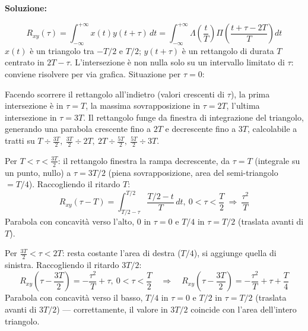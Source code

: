 \documentclass[12pt, a4paper]{article}
\begin{document}
\textbf{Soluzione:}

$$R_{xy}(\tau) = \int_{-\infty}^{+\infty}x(t)y(t+\tau)\,dt = \int_{-\infty}^{+\infty}\Lambda\!\left(\frac tT\right)\Pi\!\left(\frac{t+\tau-2T}{T}\right)dt$$
$x(t)$ è un triangolo tra $-T/2$ e $T/2$; $y(t+\tau)$ è un rettangolo di durata $T$ centrato in $2T-\tau$. L'intersezione è non nulla solo su un intervallo limitato di $\tau$: conviene risolvere per via grafica. Situazione per $\tau=0$:

\begin{center}

\end{center}

Facendo scorrere il rettangolo all'indietro (valori crescenti di $\tau$), la prima intersezione è in $\tau=T$, la massima sovrapposizione in $\tau=2T$, l'ultima intersezione in $\tau=3T$. Il rettangolo funge da finestra di integrazione del triangolo, generando una parabola crescente fino a $2T$ e decrescente fino a $3T$, calcolabile a tratti su $T\div\frac{3T}2,\ \frac{3T}2\div2T,\ 2T\div\frac{5T}2,\ \frac{5T}2\div3T$.

Per $T<\tau<\frac{3T}2$: il rettangolo finestra la rampa decrescente, da $\tau=T$ (integrale su un punto, nullo) a $\tau=3T/2$ (piena sovrapposizione, area del semi-triangolo $=T/4$). Raccogliendo il ritardo $T$:
$$R_{xy}(\tau-T) = \int_{T/2-\tau}^{T/2}\frac{T/2-t}{T}\,dt,\ 0<\tau<\frac T2 \ \Longrightarrow\ \frac{\tau^2}{T}$$
Parabola con concavità verso l'alto, $0$ in $\tau=0$ e $T/4$ in $\tau=T/2$ (traslata avanti di $T$).

Per $\frac{3T}2<\tau<2T$: resta costante l'area di destra ($T/4$), si aggiunge quella di sinistra. Raccogliendo il ritardo $3T/2$:
$$R_{xy}\!\left(\tau-\frac{3T}2\right) = -\frac{\tau^2}{T}+\tau,\ 0<\tau<\frac T2 \quad\Longrightarrow\quad R_{xy}\!\left(\tau-\frac{3T}2\right)=-\frac{\tau^2}T+\tau+\frac T4$$
Parabola con concavità verso il basso, $T/4$ in $\tau=0$ e $T/2$ in $\tau=T/2$ (traslata avanti di $3T/2$) — correttamente, il valore in $3T/2$ coincide con l'area dell'intero triangolo.
\end{document}

